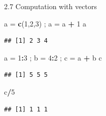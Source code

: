 \documentclass[
  ignorenonframetext,
]{beamer}
\newenvironment{Shaded}{\begin{snugshade}}{\end{snugshade}}
\newcommand{\DecValTok}[1]{\textcolor[rgb]{0.00,0.00,0.81}{#1}}
\newcommand{\FunctionTok}[1]{\textcolor[rgb]{0.13,0.29,0.53}{\textbf{#1}}}
\newcommand{\NormalTok}[1]{#1}
\newcommand{\OtherTok}[1]{\textcolor[rgb]{0.56,0.35,0.01}{#1}}
\newcommand{\SpecialCharTok}[1]{\textcolor[rgb]{0.81,0.36,0.00}{\textbf{#1}}}
\begin{document}
\begin{frame}[fragile]{2.7 Computation with vectors}
\protect\hypertarget{computation-with-vectors}{}
\begin{Shaded}
\begin{Highlighting}[]
\NormalTok{a }\OtherTok{=} \FunctionTok{c}\NormalTok{(}\DecValTok{1}\NormalTok{,}\DecValTok{2}\NormalTok{,}\DecValTok{3}\NormalTok{) ; a }\OtherTok{=}\NormalTok{ a }\SpecialCharTok{+} \DecValTok{1}
\NormalTok{a}
\end{Highlighting}
\end{Shaded}

\begin{verbatim}
## [1] 2 3 4
\end{verbatim}

\begin{Shaded}
\begin{Highlighting}[]
\NormalTok{a }\OtherTok{=} \DecValTok{1}\SpecialCharTok{:}\DecValTok{3}\NormalTok{ ; b }\OtherTok{=} \DecValTok{4}\SpecialCharTok{:}\DecValTok{2}\NormalTok{ ; c }\OtherTok{=}\NormalTok{ a }\SpecialCharTok{+}\NormalTok{ b}
\NormalTok{c}
\end{Highlighting}
\end{Shaded}

\begin{verbatim}
## [1] 5 5 5
\end{verbatim}

\begin{Shaded}
\begin{Highlighting}[]
\NormalTok{c}\SpecialCharTok{/}\DecValTok{5}
\end{Highlighting}
\end{Shaded}

\begin{verbatim}
## [1] 1 1 1
\end{verbatim}
\end{frame}
\end{document}
